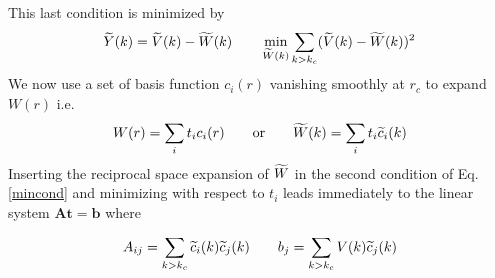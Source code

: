 This last condition is minimized by
\begin{equation}
\widetilde{Y}(k)=\widetilde{V}(k)-\widetilde{W}(k)\qquad \min_{\widetilde{W}(k)}\sum_{k>k_c}(\widetilde{V}(k)-\widetilde{W}(k))^2
\label{mincond}
\end{equation}
We now use a set of basis function $c_i(r)$ vanishing smoothly at $r_c$
to expand $W(r)$ i.e.
\begin{equation}
W(r)=\sum_i t_i c_i(r)\qquad\text{or}\qquad \widetilde{W}(k)=\sum_i t_i \widetilde{c}_i(k)
\end{equation}
Inserting the reciprocal space expansion of $\widetilde{W}$ in the second condition of
Eq.\ref{mincond} and minimizing with respect to $t_i$ leads immediately
to the linear system $\mathbf{A}\mathbf{t}=\mathbf{b}$ where
\begin{center}
\vskip 3mm
\begin{eqnarray}
A_{ij}=\sum_{k>k_c}\widetilde{c}_i(k)\widetilde{c}_j(k)\qquad b_j=\sum_{k>k_c} V(k) \widetilde{c}_j(k)
\label{matrix_elements}
\end{eqnarray}

\end{center}
\vskip 3mm

